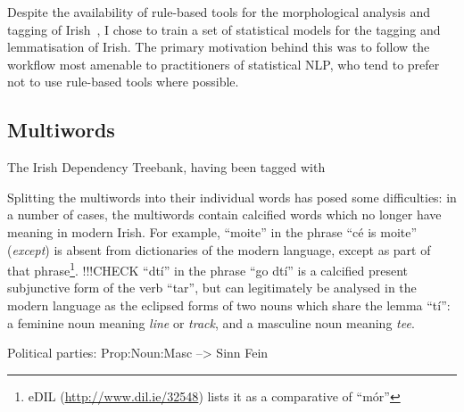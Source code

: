 
Despite the availability of rule-based tools for the morphological analysis and tagging of Irish~\citep{elaine09}, I chose to train a set of statistical models for the tagging and lemmatisation of Irish. The primary motivation behind this was to follow the workflow most amenable to practitioners of statistical NLP, who tend to prefer not to use rule-based tools where possible.



\subsection{Multiwords}

The Irish Dependency Treebank, having been tagged with 

Splitting the multiwords into their individual words has posed some difficulties: in a number of cases, the multiwords contain calcified words which no longer have meaning in modern Irish. For example, ``moite'' in the phrase ``c\'e is moite'' (\textit{except}) is absent from dictionaries of the modern language, except as part of that phrase\footnote{eDIL (\href{http://www.dil.ie/32548}{http://www.dil.ie/32548}) lists it as a comparative of ``m\'or''}. 
!!!CHECK
``dt\'i'' in the phrase ``go dt\'i'' is a calcified present subjunctive form of the verb ``tar'', but can legitimately be analysed in the modern language as the eclipsed forms of two nouns which share the lemma ``t\'i'': a feminine noun meaning \textit{line} or \textit{track}, and a masculine noun meaning \textit{tee}.

Political parties: Prop:Noun:Masc --> Sinn Fein

